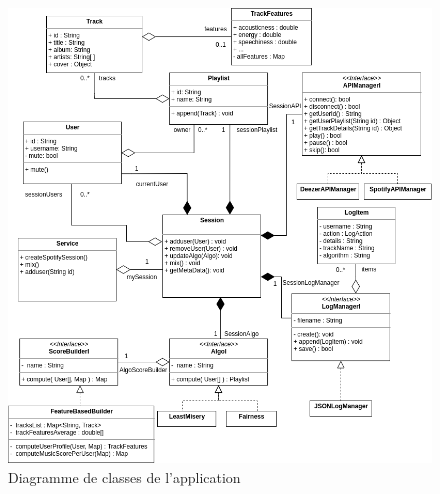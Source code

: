 \documentclass{article}
\begin{document}
		\newpage
		\begin{figure}[h!]
			\includegraphics[width=\linewidth]{ressources/diagramme_classes.png}
			\caption{Diagramme de classes de l'application}
			\label{fig:class_diag}
		\end{figure}
		
		\newpage
		
\end{document}
